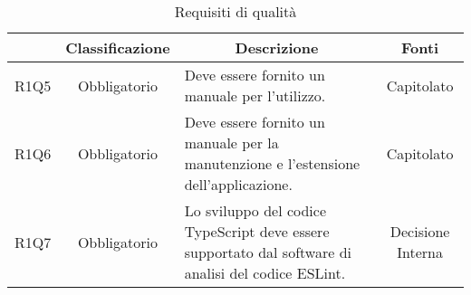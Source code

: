 \begin{table}[H]
    \centering
    \renewcommand{\arraystretch}{1.8}
    \begin{tabular}{c | c | p{6cm} | c}
        \rowcolor[HTML]{125E28}
        \multicolumn{1}{c}{\color[HTML]{FFFFFF} \textbf{Codice}}          &
        \multicolumn{1}{c}{\color[HTML]{FFFFFF} \textbf{Classificazione}} &
        \multicolumn{1}{c}{\color[HTML]{FFFFFF} \textbf{Descrizione}}     &
        \multicolumn{1}{c}{\color[HTML]{FFFFFF} \textbf{Fonti}}                                                                                                                                                                \\
        \hline
        R1Q5                                                              & Obbligatorio & Deve essere fornito un manuale per l'utilizzo.                                                                  & Capitolato        \\
        R1Q6                                                              & Obbligatorio & Deve essere fornito un manuale per la manutenzione e l'estensione dell'applicazione.                            & Capitolato        \\
        R1Q7                                                              & Obbligatorio & Lo sviluppo del codice TypeScript\glo{} deve essere supportato dal software di analisi del codice ESLint\glo{}. & Decisione Interna \\
    \end{tabular}
    \caption{Requisiti di qualità}
\end{table}

